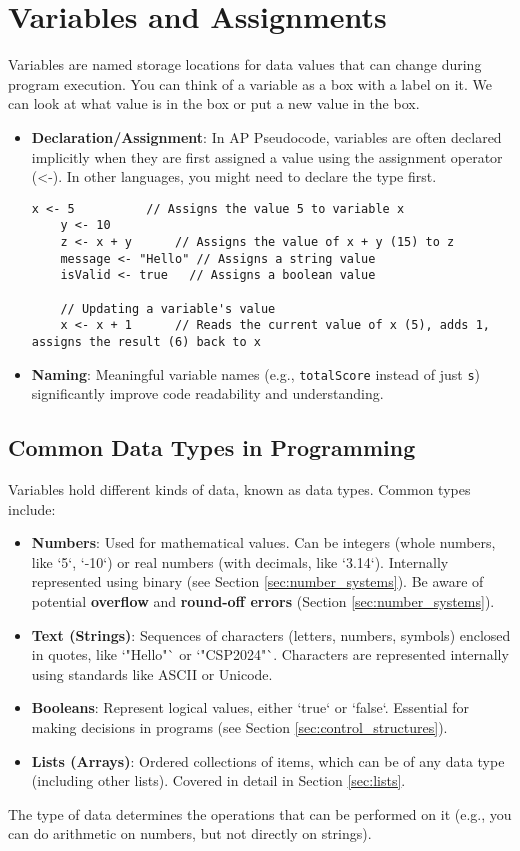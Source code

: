 \documentclass[11pt,oneside]{book}
\begin{document}
\section{Variables and Assignments}
\label{sec:variables_assignment}
Variables are named storage locations for data values that can change during program execution. You can think of a variable as a box with a label on it. We can look at what value is in the box or put a new value in the box.

\begin{itemize}
    \item \textbf{Declaration/Assignment}: In AP Pseudocode, variables are often declared implicitly when they are first assigned a value using the assignment operator (<-). In other languages, you might need to declare the type first.
    \begin{lstlisting}[language={}, label={lst:assignment_detail}, caption={AP Pseudocode: Assignment Examples}]
    x <- 5          // Assigns the value 5 to variable x
    y <- 10
    z <- x + y      // Assigns the value of x + y (15) to z
    message <- "Hello" // Assigns a string value
    isValid <- true   // Assigns a boolean value

    // Updating a variable's value
    x <- x + 1      // Reads the current value of x (5), adds 1, assigns the result (6) back to x
    \end{lstlisting}
    \item \textbf{Naming}: Meaningful variable names (e.g., \texttt{totalScore} instead of just \texttt{s}) significantly improve code readability and understanding.
\end{itemize}

\subsection*{Common Data Types in Programming}
Variables hold different kinds of data, known as data types. Common types include:
\begin{itemize}
    \item \textbf{Numbers}: Used for mathematical values. Can be integers (whole numbers, like `5`, `-10`) or real numbers (with decimals, like `3.14`). Internally represented using binary (see Section \ref{sec:number_systems}). Be aware of potential \textbf{overflow} and \textbf{round-off errors} (Section \ref{sec:number_systems}).
    \item \textbf{Text (Strings)}: Sequences of characters (letters, numbers, symbols) enclosed in quotes, like `"Hello"` or `"CSP2024"`. Characters are represented internally using standards like ASCII or Unicode.
    \item \textbf{Booleans}: Represent logical values, either `true` or `false`. Essential for making decisions in programs (see Section \ref{sec:control_structures}).
    \item \textbf{Lists (Arrays)}: Ordered collections of items, which can be of any data type (including other lists). Covered in detail in Section \ref{sec:lists}.
\end{itemize}
The type of data determines the operations that can be performed on it (e.g., you can do arithmetic on numbers, but not directly on strings).
\end{document}
